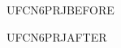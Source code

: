 \documentclass{abntexto-ufc}
\begin{document}
UFCN6PRJBEFORE\par
\imprimircapa
UFCN6PRJAFTER\par
\end{document}
